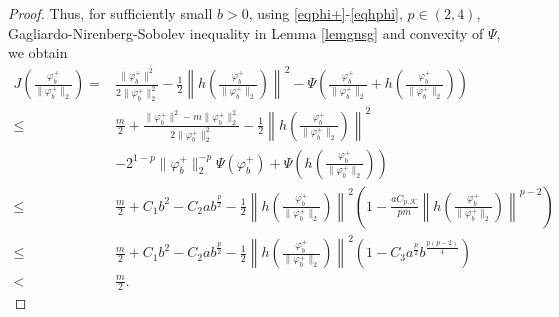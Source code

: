 \documentclass[10pt,a4paper]{amsart}
\newcommand{\K}{\mathcal{K}}
\newcommand{\norm}[1]{\lVert#1\rVert}
\begin{document}
\begin{proof}
Thus, for sufficiently small $b>0$, using \eqref{eqphi+}-\eqref{eqhphi}, $p \in (2,4)$, Gagliardo-Nirenberg-Sobolev inequality in Lemma \ref{lemgnsg} and convexity of $\Psi$, we obtain
    \begin{equation}\label{eqjsmallm}
            \begin{aligned}
                J(\frac{\varphi_b^+}{\norm{\varphi_b^+}_2}) =& \frac{\norm{\varphi_b^+}^2}{2\norm{\varphi_b^+}^2_2}-\frac{1}{2}\left\lVert h\left(\frac{\varphi_b^+}{\norm{\varphi_b^+}_2}\right) \right\rVert^2 - \Psi\left(\frac{\varphi_b^+}{\norm{\varphi_b^+}_2}+h\left(\frac{\varphi_b^+}{\norm{\varphi_b^+}_2}\right)\right)\\
                \leq& \frac{m}{2} + \frac{\norm{\varphi_b^+}^2 - m\norm{\varphi_b^+}^2_2}{2\norm{\varphi_b^+}^2_2}   -\frac{1}{2}\left\lVert h\left(\frac{\varphi_b^+}{\norm{\varphi_b^+}_2}\right) \right\rVert^2\\
                & - 2^{1-p}\norm{\varphi_b^+}_2^{-p}\Psi(\varphi_b^+) +  \Psi\left(h\left(\frac{\varphi_b^+}{\norm{\varphi_b^+}_2}\right)\right)\\
                \leq& \frac{m}{2} + C_1b^2 - C_2ab^\frac{p}{2} - \frac{1}{2}\left\lVert h\left(\frac{\varphi_b^+}{\norm{\varphi_b^+}_2}\right)\right\rVert^2\left(1 - \frac{aC_{p,\K}}{pm}\left\lVert h\left(\frac{\varphi_b^+}{\norm{\varphi_b^+}_2}\right) \right\rVert^{p-2}\right) \\
                \leq& \frac{m}{2} + C_1b^2 - C_2ab^\frac{p}{2} - \frac{1}{2}\left\lVert h\left(\frac{\varphi_b^+}{\norm{\varphi_b^+}_2}\right)\right\rVert^2(1 - C_3 a^\frac{p}{2}b^\frac{p(p-2)}{4})\\
                <& \frac{m}{2}.
    \end{aligned}
    \end{equation}


\end{proof}
\end{document}
